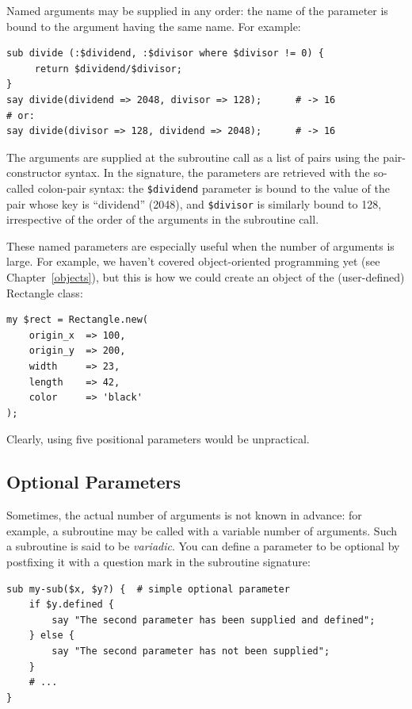 Named arguments may be supplied in any order: the name of 
the parameter is bound to the argument having the same 
name. For example:

\begin{verbatim}
sub divide (:$dividend, :$divisor where $divisor != 0) {
     return $dividend/$divisor;
}
say divide(dividend => 2048, divisor => 128);      # -> 16
# or:
say divide(divisor => 128, dividend => 2048);      # -> 16
\end{verbatim}

The arguments are supplied at the subroutine call as a list of 
pairs using the pair-constructor syntax. In the signature, 
the parameters are retrieved with the 
so-called colon-pair syntax: the \verb'$dividend' parameter is 
bound to the value of the pair whose key is ``dividend'' (2048), 
and \verb'$divisor' is similarly bound to 128, irrespective of 
the order of the arguments in the subroutine call.

These named parameters are especially useful when the number of 
arguments is large. For example, we haven't covered 
object-oriented programming yet (see Chapter~\ref{objects}), 
but this is how we could create an object of the 
(user-defined) Rectangle class:

\begin{verbatim}
my $rect = Rectangle.new( 
    origin_x  => 100, 
    origin_y  => 200, 
    width     => 23,
    length    => 42,
    color     => 'black'
);
\end{verbatim}

Clearly, using five positional parameters would be unpractical. 

\subsection{Optional Parameters}

Sometimes, the actual number of arguments is not known 
in advance: for example, a subroutine may be called with 
a variable number of arguments. Such a subroutine is said 
to be \emph{variadic}. You can define a parameter to be 
optional by postfixing it with a question mark in the 
subroutine signature:

\begin{verbatim}
sub my-sub($x, $y?) {  # simple optional parameter
    if $y.defined {
        say "The second parameter has been supplied and defined";
    } else {
        say "The second parameter has not been supplied";
    }
    # ...
}
\end{verbatim}

